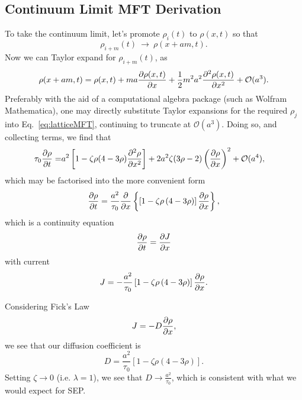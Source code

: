 \subsection{Continuum Limit MFT Derivation}
To take the continuum limit, let's promote $\rho_i (t)$ to $\rho(x, t)$ so that 
\begin{equation}
\rho_{i+m}(t)~\rightarrow~\rho(x+am,t).
\end{equation}
Now we can Taylor expand for $\rho_{i+m} (t)$, as
\begin{equation}
 \rho(x+am,t) = \rho(x, t) + ma \frac{\partial \rho(x, t)}{\partial x} + \frac{1}{2} m^2 a^2 \frac{\partial ^2\rho(x, t)}{\partial x^2} + \mathcal{O}(a^3). 
\end{equation}
Preferably with the aid of a computational algebra package (such as Wolfram Mathematica), one may directly substitute Taylor expansions for the required $\rho_j$ into Eq.~\eqref{eq:latticeMFT}, continuing to truncate
at $\mathcal{O}(a^3)$. Doing so, and collecting terms, we find that
\begin{align}
  \tau_0 \frac{\partial \rho}{\partial t} =& a^2 \left[ 1-\zeta \rho (4-3\rho) \frac{\partial ^2 \rho}{\partial x^2}  \right] +
  2 a^2 \zeta (3\rho-2) \left(\frac{\partial \rho}{\partial x}\right)^2 + \mathcal{O}(a^4) ,
\end{align}
which may be factorised into the more convenient form
\begin{equation}
\label{eq:contPDE}
 \frac{\partial \rho}{\partial t} = \frac{a^2}{\tau_0} \frac{\partial }{\partial x} \left\{ \left[1 - \zeta \rho\left(4-3\rho\right) \right] \frac{\partial \rho}{\partial x} \right\},
\end{equation}
which is a continuity equation
\begin{equation}
 \frac{\partial \rho}{\partial t} = \frac{\partial J}{\partial x} 
\end{equation}
with current
\begin{equation}
J = -\frac{a^2}{\tau_0} \left[1 - \zeta \rho\left(4-3\rho\right) \right] \frac{\partial \rho}{\partial x}.
\end{equation}

Considering Fick's Law
\begin{equation}
 J = - D \frac{\partial \rho}{\partial x},
\end{equation}
we see that our diffusion coefficient is
\begin{equation}
 D = \frac{a^2}{\tau_0} \left[1 - \zeta \rho\left(4-3\rho\right) \right].
\end{equation}
Setting $\zeta \rightarrow 0$ (i.e. $\lambda = 1$), we see that $D \rightarrow \frac{a^2}{\tau_0}$, which is consistent with what we would expect for SEP.

